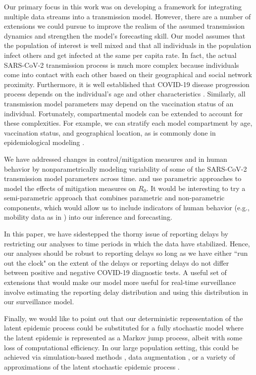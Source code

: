 Our primary focus in this work was on developing a framework for integrating multiple data streams into a transmission model.
However, there are a number of extensions we could pursue to improve the realism of the assumed transmission dynamics and strengthen the model's forecasting skill.
Our model assumes that the population of interest is well mixed and that all individuals in the population infect others and get infected at the same per capita rate.
In fact, the actual SARS-CoV-2 transmission process is much more complex because individuals come into contact with each other based on their geographical and social network proximity.
Furthermore, it is well established that COVID-19 disease progression process depends on the individual's age and other characteristics \citep{kim2020risk,bhargava2020predictors, petrilli2020factors}.
Similarly, all transmission model parameters may depend on the vaccination status of an individual.
Fortunately, compartmental models can be extended to account for these complexities.
For example, we can stratify each model compartment by age, vaccination status, and geographical location, as is commonly done in epidemiological modeling \citep{li2008continuous, van2008spatial}.
\par
We have addressed changes in control/mitigation measures and in human behavior by nonparametrically modeling variability of some of the SARS-CoV-2 transmission model parameters across time.
\citet{anderson2020} and \citet{Jewell2021complicated} use parametric approaches to model the effects of mitigation measures on $R_0$.
It would be interesting to try a semi-parametric approach that combines parametric and non-parametric components, which would allow us to include indicators of human behavior (e.g., mobility data as in \citet{Jewell2021complicated}) into our inference and forecasting.
\par
In this paper, we have sidestepped the thorny issue of reporting delays by restricting our analyses to time periods in which the data have stabilized.
Hence, our analyses should be robust to reporting delays so long as we have either ``run out the clock" on the extent of the delays or reporting delays do not differ between positive and negative COVID-19 diagnostic tests. A useful set of extensions that would make our model more useful for real-time surveillance involve estimating the reporting delay distribution \citep{hohle2014bayesian,stoner2019multivariate} and using this distribution in our surveillance model.
\par
Finally, we would like to point out that our deterministic representation of the latent epidemic process could be substituted for a fully stochastic model where the latent epidemic is represented as a Markov jump process, albeit with some loss of computational efficiency. In our large population setting, this could be achieved via simulation-based methods \citep{breto2009time, andrieu2010particle,dukic2012tracking}, data augmentation \citep{pooley2015using,nguyen2021stochastic}, or a variety of approximations of the latent stochastic epidemic process \citep{lekone2006statistical,cauchemez2008likelihood,fintzi2020linear}.
